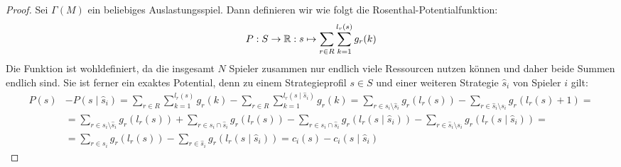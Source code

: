 \begin{proof}
	Sei $\Gamma(M)$ ein beliebiges Auslastungsspiel. Dann definieren wir wie folgt die Rosenthal-Potentialfunktion:
		\[P: S \to \mathbb{R}: s \mapsto \sum_{r \in R}\sum_{k=1}^{l_r(s)} g_r(k) \]
	Die Funktion ist wohldefiniert, da die insgesamt $N$ Spieler zusammen nur endlich viele Ressourcen nutzen können und daher beide Summen endlich sind. Sie ist ferner ein exaktes Potential, denn zu einem Strategieprofil $s \in S$ und einer weiteren Strategie $\hat{s}_i$ von Spieler $i$ gilt:
	\begin{align*}
		P(s) 	&- P(s\mid \hat{s}_i) = \sum_{r \in R}\sum_{k=1}^{l_r(s)} g_r(k) - \sum_{r \in R}\sum_{k=1}^{l_r(s\mid \hat{s}_i)} g_r(k) = \sum_{r \in s_i \setminus \hat{s}_i} g_r(l_r(s)) - \sum_{r \in \hat{s}_i \setminus s_i} g_r(l_r(s)+1) = \\
				&= \sum_{r \in s_i \setminus \hat{s}_i} g_r(l_r(s)) + \sum_{r \in s_i \cap \hat{s}_i} g_r(l_r(s)) - \sum_{r \in s_i \cap \hat{s}_i} g_r(l_r(s \mid \hat{s}_i)) - \sum_{r \in \hat{s}_i \setminus s_i} g_r(l_r(s\mid \hat{s}_i)) = \\
				&= \sum_{r \in s_i} g_r(l_r(s)) - \sum_{r \in \hat{s}_i} g_r(l_r(s\mid \hat{s}_i)) = c_i(s) - c_i(s \mid \hat{s}_i)
	\end{align*}
	

\end{proof}
